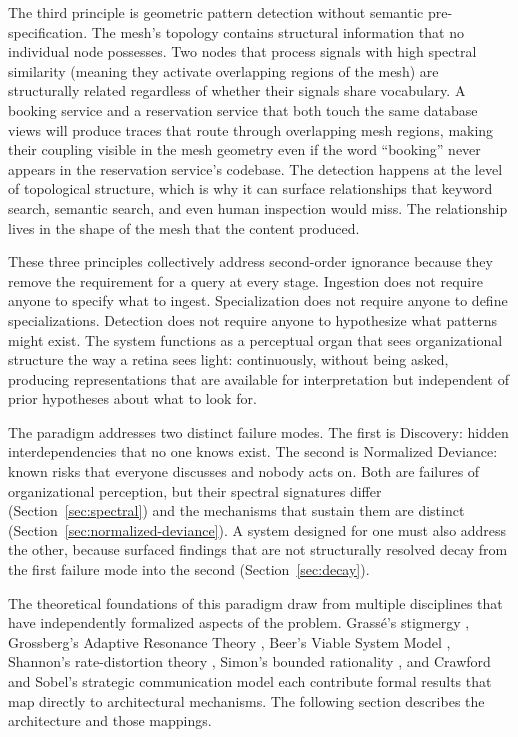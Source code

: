 \documentclass[11pt,a4paper]{article}
\begin{document}
The third principle is geometric pattern detection without semantic pre-specification. The mesh's topology contains structural information that no individual node possesses. Two nodes that process signals with high spectral similarity (meaning they activate overlapping regions of the mesh) are structurally related regardless of whether their signals share vocabulary. A booking service and a reservation service that both touch the same database views will produce traces that route through overlapping mesh regions, making their coupling visible in the mesh geometry even if the word ``booking'' never appears in the reservation service's codebase. The detection happens at the level of topological structure, which is why it can surface relationships that keyword search, semantic search, and even human inspection would miss. The relationship lives in the shape of the mesh that the content produced.

These three principles collectively address second-order ignorance because they remove the requirement for a query at every stage. Ingestion does not require anyone to specify what to ingest. Specialization does not require anyone to define specializations. Detection does not require anyone to hypothesize what patterns might exist. The system functions as a perceptual organ that sees organizational structure the way a retina sees light: continuously, without being asked, producing representations that are available for interpretation but independent of prior hypotheses about what to look for.

The paradigm addresses two distinct failure modes. The first is Discovery: hidden interdependencies that no one knows exist. The second is Normalized Deviance: known risks that everyone discusses and nobody acts on. Both are failures of organizational perception, but their spectral signatures differ (Section~\ref{sec:spectral}) and the mechanisms that sustain them are distinct (Section~\ref{sec:normalized-deviance}). A system designed for one must also address the other, because surfaced findings that are not structurally resolved decay from the first failure mode into the second (Section~\ref{sec:decay}).

The theoretical foundations of this paradigm draw from multiple disciplines that have independently formalized aspects of the problem. Grass\'{e}'s stigmergy \citep{grasse1959}, Grossberg's Adaptive Resonance Theory \citep{grossberg1976}, Beer's Viable System Model \citep{beer1972}, Shannon's rate-distortion theory \citep{shannon1959}, Simon's bounded rationality \citep{simon1956}, and Crawford and Sobel's strategic communication model \citep{crawford1982} each contribute formal results that map directly to architectural mechanisms. The following section describes the architecture and those mappings.
\end{document}
